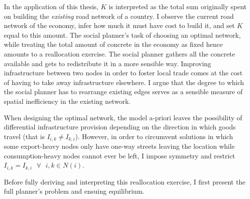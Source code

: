 \documentclass[11pt, oneside]{article}   	%
\begin{document}
In the application of this thesis, $K$ is interpreted as the total sum originally spent on building the \emph{existing} road network of a country. I observe the current road network of the economy, infer how much it must have cost to build it, and set $K$ equal to this amount. The social planner's task of choosing an optimal network, while treating the total amount of concrete in the economy as fixed hence amounts to a reallocation exercise. The social planner gathers all the concrete available and gets to redistribute it in a more sensible way. Improving infrastructure between two nodes in order to foster local trade comes at the cost of having to take away infrastructure elsewhere. I argue that the degree to which the social planner has to rearrange existing edges serves as a sensible measure of spatial inefficiency in the existing network.

When designing the optimal network, the model a-priori leaves the possibility of differential infrastructure provision depending on the direction in which goods travel (that is $I_{i,k} \neq I_{k,i}$). However, in order to circumvent solutions in which some export-heavy nodes only have one-way streets leaving the location while consumption-heavy nodes cannot ever be left, I impose symmetry and restrict $I_{i,k} = I_{k,i} \textrm{ } \forall \textrm{ } i,k\in N(i)$.

Before fully deriving and interpreting this reallocation exercise, I first present the full planner's problem and ensuing equilibrium.
\end{document}
